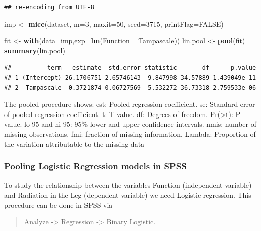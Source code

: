 \documentclass[
]{book}
\newenvironment{Shaded}{\begin{snugshade}}{\end{snugshade}}
\newcommand{\DataTypeTok}[1]{\textcolor[rgb]{0.13,0.29,0.53}{#1}}
\newcommand{\DecValTok}[1]{\textcolor[rgb]{0.00,0.00,0.81}{#1}}
\newcommand{\KeywordTok}[1]{\textcolor[rgb]{0.13,0.29,0.53}{\textbf{#1}}}
\newcommand{\NormalTok}[1]{#1}
\newcommand{\OperatorTok}[1]{\textcolor[rgb]{0.81,0.36,0.00}{\textbf{#1}}}
\newcommand{\OtherTok}[1]{\textcolor[rgb]{0.56,0.35,0.01}{#1}}
\newcommand{\StringTok}[1]{\textcolor[rgb]{0.31,0.60,0.02}{#1}}
\begin{document}
\begin{verbatim}
## re-encoding from UTF-8
\end{verbatim}

\begin{Shaded}
\begin{Highlighting}[]
\NormalTok{imp <-}\StringTok{ }\KeywordTok{mice}\NormalTok{(dataset, }\DataTypeTok{m=}\DecValTok{3}\NormalTok{, }\DataTypeTok{maxit=}\DecValTok{50}\NormalTok{, }\DataTypeTok{seed=}\DecValTok{3715}\NormalTok{, }\DataTypeTok{printFlag=}\OtherTok{FALSE}\NormalTok{)}

\NormalTok{fit <-}\StringTok{ }\KeywordTok{with}\NormalTok{(}\DataTypeTok{data=}\NormalTok{imp,}\DataTypeTok{exp=}\KeywordTok{lm}\NormalTok{(Function }\OperatorTok{~}\StringTok{ }\NormalTok{Tampascale))}
\NormalTok{lin.pool <-}\StringTok{ }\KeywordTok{pool}\NormalTok{(fit)}
\KeywordTok{summary}\NormalTok{(lin.pool)}
\end{Highlighting}
\end{Shaded}

\begin{verbatim}
##          term   estimate  std.error statistic       df      p.value
## 1 (Intercept) 26.1706751 2.65746143  9.847998 34.57889 1.439049e-11
## 2  Tampascale -0.3721874 0.06727569 -5.532272 36.73318 2.759533e-06
\end{verbatim}

The pooled procedure shows: est: Pooled regression coefficient. se:
Standard error of pooled regression coefficient. t: T-value. df: Degrees
of freedom. Pr(\textgreater\textbar t\textbar): P-value. lo 95 and hi
95: 95\% lower and upper confidence intervals. nmis: number of missing
observations. fmi: fraction of missing information. Lambda: Proportion
of the variation attributable to the missing data

\hypertarget{pooling-logistic-regression-models-in-spss}{%
\subsubsection{Pooling Logistic Regression models in
SPSS}\label{pooling-logistic-regression-models-in-spss}}

To study the relationship between the variables Function (independent
variable) and Radiation in the Leg (dependent variable) we need Logistic
regression. This procedure can be done in SPSS via

\begin{quote}
Analyze -\textgreater{} Regression -\textgreater{} Binary Logistic.
\end{quote}
\end{document}
